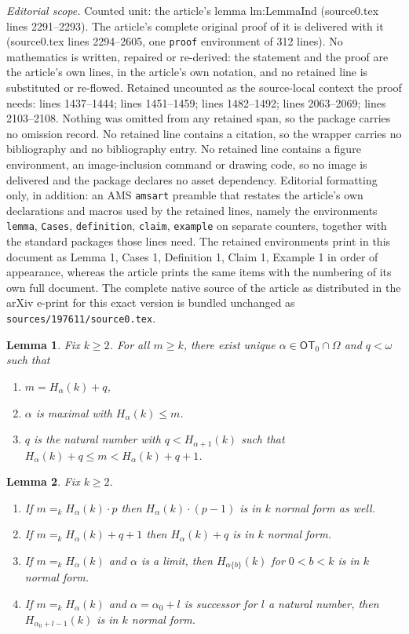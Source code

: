 \documentclass[10pt,a4paper]{amsart}
\newtheorem{lemma}{Lemma}
\newcommand\OT{\mathsf{OT}}
\newcommand{\Om}{{\Omega}}
\newcommand{\al}{{\alpha}}
\newcommand{\om}{\omega}
\begin{document}
\noindent\textit{Editorial scope.} Counted unit: the article's lemma lm:LemmaInd (source0.tex lines 2291--2293). The article's complete original proof of it is delivered with it (source0.tex lines 2294--2605, one \texttt{proof} environment of 312 lines). No mathematics is written, repaired or re-derived: the statement and the proof are the article's own lines, in the article's own notation, and no retained line is substituted or re-flowed.  Retained uncounted as the source-local context the proof needs: lines 1437--1444; lines 1451--1459; lines 1482--1492; lines 2063--2069; lines 2103--2108.  Nothing was omitted from any retained span, so the package carries no omission record.  No retained line contains a citation, so the wrapper carries no bibliography and no bibliography entry.  No retained line contains a figure environment, an image-inclusion command or drawing code, so no image is delivered and the package declares no asset dependency.  Editorial formatting only, in addition: an AMS \texttt{amsart} preamble that restates the article's own declarations and macros used by the retained lines, namely the environments \texttt{lemma}, \texttt{Cases}, \texttt{definition}, \texttt{claim}, \texttt{example} on separate counters, together with the standard packages those lines need.  The retained environments print in this document as Lemma 1, Cases 1, Definition 1, Claim 1, Example 1 in order of appearance, whereas the article prints the same items with the numbering of its own full document.  The complete native source of the article as distributed in the arXiv e-print for this exact version is bundled unchanged as \texttt{sources/197611/source0.tex}.
\begin{lemma}\label{lm:HardyNF}
Fix $k\geq 2$.  For all $m\geq k$, there exist unique $\al\in  \OT_0\cap \Om$ and $q<\om$ such that
\begin{enumerate}
    \item $m=H_\al(k) +q$,
    \item $\al$ is maximal with $H_\al(k) \leq m$. %
    \item $q$ is the natural number with $q < H_{\al+1}(k)$ such that $H_\al(k) +q \leq m < H_\al(k) +q+1$.
\end{enumerate}
\end{lemma}

\begin{lemma}\label{lm:NForms} Fix $k\geq 2$.
\begin{enumerate}
    \item If $m=_{k} H_\al(k) \cdot p$ then $H_\al(k) \cdot (p-1)$ is in $k$ normal form as well.
    \item If  $m=_{k} H_\al(k) +q+1$ then $H_\al(k) + q$ is in $k$ normal form.
    \item If $m=_{k}H_\al(k)$ and $\al$ is a limit, then $H_{\al\{b\}}(k)$ for $0<b<k$ is in $k$ normal form. 
    \item If $m=_{k}H_{\al}(k)$ and $\al =\al_0+l$ is successor for $l$ a natural number,
    then $H_{\al_0+l-1}(k)$ is in $k$ normal form. 
\end{enumerate}
\end{lemma}
\end{document}
